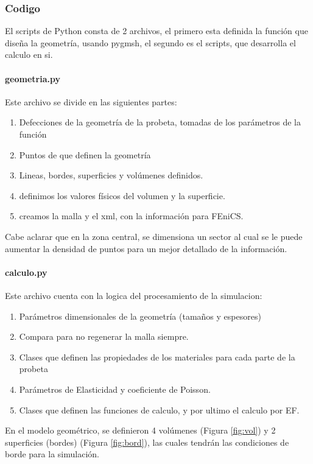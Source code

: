 \documentclass[12pt, a4paper]{article}
\begin{document}
\subsubsection{Codigo}

El scripts de Python consta de 2 archivos, el primero esta definida la función que diseña la geometría, usando pygmsh, el segundo es el scripts, que desarrolla el calculo en si.

\paragraph{geometria.py} Este archivo se divide en las siguientes partes:

\begin{enumerate}
	\item Defecciones de la geometría de la probeta, tomadas de los parámetros de la función
	\item Puntos de que definen la geometría
	\item Lineas, bordes, superficies y volúmenes definidos.
	\item definimos los valores físicos del volumen y la superficie.
	\item creamos la malla y el xml, con la información para FEniCS. 
\end{enumerate}

Cabe aclarar que en la zona central, se dimensiona un sector al cual se le puede aumentar la densidad de puntos para un mejor detallado de la información.

\paragraph{calculo.py} Este archivo cuenta con la logica del procesamiento de la simulacion:

\begin{enumerate}
	\item Parámetros dimensionales de la geometría (tamaños y espesores)
	\item Compara para no regenerar la malla siempre.
	\item Clases que definen las propiedades de los materiales para cada parte de la probeta
	\item Parámetros de Elasticidad y coeficiente de Poisson.
	\item Clases que definen las funciones de calculo, y por ultimo el calculo por EF. 
\end{enumerate}


En el modelo geométrico, se definieron 4 volúmenes (Figura \ref{fig:vol}) y 2 superficies (bordes) (Figura \ref{fig:bord}), las cuales tendrán las condiciones de borde para la simulación.
\end{document}
